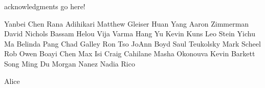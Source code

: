 acknowledgments go here!

Yanbei Chen
Rana Adihikari
Matthew Gleiser
Huan Yang
Aaron Zimmerman
David Nichols
Bassam Helou
Vija Varma
Hang Yu
Kevin Kuns
Leo Stein
Yichu Ma
Belinda Pang
Chad Galley
Ron Tso
JoAnn Boyd
Saul Teukolsky
Mark Scheel
Rob Owen
Boayi Chen
Max Isi
Craig Cahilane
Masha Okonouva
Kevin Barkett
Song Ming Du
Morgan Nanez
Nadia
Rico

Alice